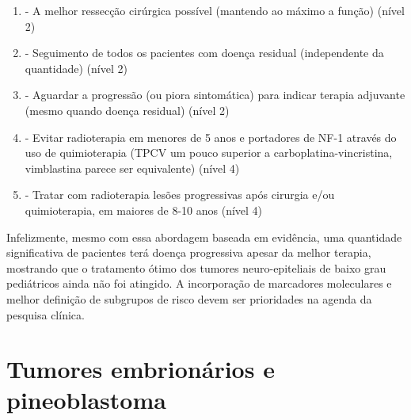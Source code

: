 \documentclass[11pt,a4paper,oldfontcommands]{memoir}
\begin{document}
\renewcommand{\labelenumi}{\Alph{enumi}}
\begin{enumerate}
\item - A melhor ressecção cirúrgica possível (mantendo ao máximo a função) (nível 2)
\item - Seguimento de todos os pacientes com doença residual (independente da quantidade) (nível 2)
\item - Aguardar a progressão (ou piora sintomática) para indicar terapia adjuvante (mesmo quando doença residual) (nível 2)
\item - Evitar radioterapia em menores de 5 anos e portadores de NF-1 através do uso de quimioterapia (TPCV um pouco superior a carboplatina-vincristina, vimblastina parece ser equivalente) (nível 4)
\item - Tratar com radioterapia lesões progressivas após cirurgia e/ou quimioterapia, em maiores de 8-10 anos (nível 4)
\end{enumerate}

Infelizmente, mesmo com essa abordagem baseada em evidência, uma quantidade significativa de pacientes terá doença progressiva apesar da melhor terapia, mostrando que o tratamento ótimo dos tumores neuro-epiteliais de baixo grau pediátricos ainda não foi atingido. A incorporação de marcadores moleculares e melhor definição de subgrupos de risco devem ser prioridades na agenda da pesquisa clínica.

\section{Tumores embrionários e pineoblastoma}
\end{document}
